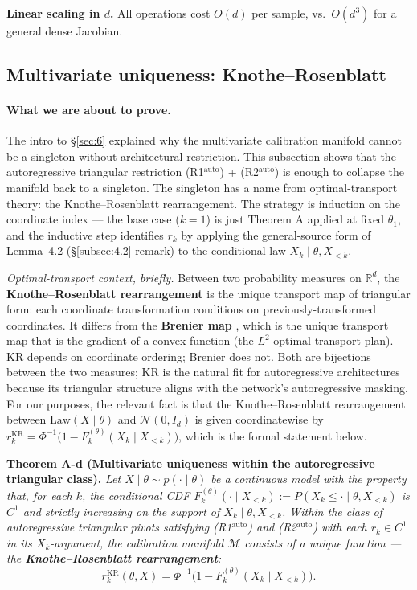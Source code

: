 \documentclass[11pt]{article}
\begin{document}
\textbf{Linear scaling in \(d\).} All operations cost \(O(d)\) per
sample, vs.~\(O(d^3)\) for a general dense Jacobian.

\subsection{Multivariate uniqueness: Knothe--Rosenblatt}\label{subsec:6.3}

\paragraph{What we are about to prove.}
The intro to \S\ref{sec:6} explained why the multivariate calibration
manifold cannot be a singleton without architectural restriction. This
subsection shows that the autoregressive triangular restriction
(R1\(^\mathrm{auto}\)) + (R2\(^\mathrm{auto}\)) is enough to collapse
the manifold back to a singleton. The singleton has a name from
optimal-transport theory: the Knothe--Rosenblatt rearrangement. The
strategy is induction on the coordinate index --- the base case (\(k = 1\))
is just Theorem A applied at fixed \(\theta_1\), and the inductive step
identifies \(r_k\) by applying the general-source form of Lemma~4.2
(\S\ref{subsec:4.2} remark) to the conditional law
\(X_k \mid \theta, X_{<k}\).

\emph{Optimal-transport context, briefly.} Between two probability
measures on \(\mathbb{R}^d\), the \textbf{Knothe--Rosenblatt
rearrangement} \citep{Knothe1957, Rosenblatt1952} is the unique transport
map of triangular form: each coordinate transformation conditions on
previously-transformed coordinates. It differs from the \textbf{Brenier
map} \citep{Brenier1991}, which is the unique transport map that is the
gradient of a convex function (the \(L^2\)-optimal transport plan). KR
depends on coordinate ordering; Brenier does not. Both are bijections
between the two measures; KR is the natural fit for autoregressive
architectures because its triangular structure aligns with the network's
autoregressive masking. For our purposes, the relevant fact is that the
Knothe--Rosenblatt rearrangement between
\(\mathrm{Law}(X \mid \theta)\) and \(\mathcal{N}(0, I_d)\) is given
coordinatewise by \(r_k^{\mathrm{KR}} = \Phi^{-1}\!\bigl(1 - F_k^{(\theta)}(X_k \mid X_{<k})\bigr)\),
which is the formal statement below.

\textbf{Theorem A-d (Multivariate uniqueness within the autoregressive
triangular class).} \emph{Let
\(X \mid \theta \sim p(\cdot \mid \theta)\) be a continuous model with
the property that, for each \(k\), the conditional CDF
\(F_k^{(\theta)}(\cdot \mid X_{<k}) := P(X_k \leq \cdot \mid \theta, X_{<k})\)
is \(C^1\) and strictly increasing on the support of
\(X_k \mid \theta, X_{<k}\). Within the class of autoregressive
triangular pivots satisfying (R1\(^\mathrm{auto}\)) and
(R2\(^\mathrm{auto}\)) with each \(r_k \in C^1\) in its
\(X_k\)-argument, the calibration manifold \(\mathcal{M}\) consists of a
unique function --- the \textbf{Knothe--Rosenblatt rearrangement}:} \[
r_k^\mathrm{KR}(\theta, X) = \Phi^{-1}\bigl(1 - F_k^{(\theta)}(X_k \mid X_{<k})\bigr).
\]
\end{document}
